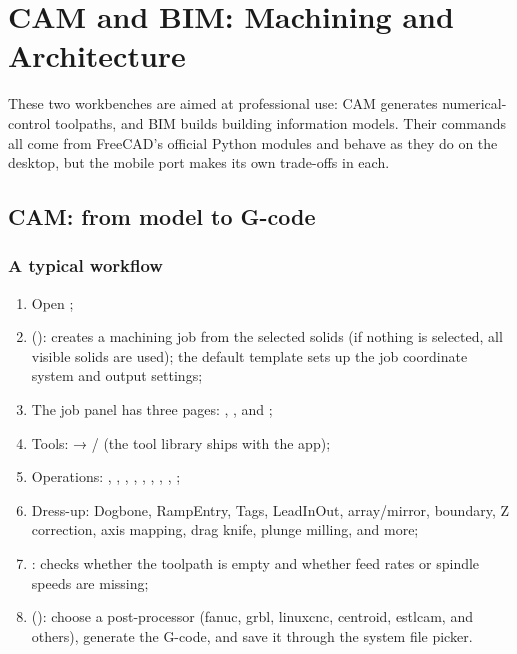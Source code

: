 \chapter{CAM and BIM: Machining and Architecture}

These two workbenches are aimed at professional use: CAM generates numerical-control toolpaths, and BIM builds
building information models. Their commands all come from FreeCAD's official Python modules and behave as
they do on the desktop, but the mobile port makes its own trade-offs in each.

\section{CAM: from model to G-code}

\subsection{A typical workflow}

\begin{enumerate}
  \item Open ;
  \item {} (): creates a machining job from the selected solids (if nothing is selected,
        all visible solids are used); the default template sets up the job coordinate system and output settings;
  \item The job panel has three pages: , , and ;
  \item Tools:  →  /  (the tool library ships with the app);
  \item Operations: , , ,
        , , , ,
        , ;
  \item Dress-up: Dogbone, RampEntry, Tags, LeadInOut,
        array/mirror, boundary, Z correction, axis mapping, drag knife, plunge milling, and more;
  \item {}: checks whether the toolpath is empty and whether feed rates or spindle speeds are missing;
  \item {} (): choose a post-processor (fanuc, grbl, linuxcnc, centroid, estlcam, and others),
        generate the G-code, and save it through the system file picker.
\end{enumerate}

